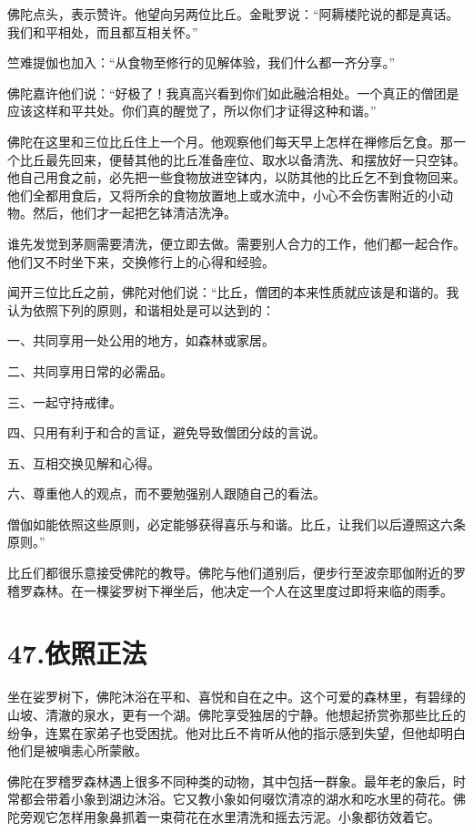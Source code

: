 \documentclass[12pt,twoside,openany]{book}
\begin{document}
佛陀点头，表示赞许。他望向另两位比丘。金毗罗说：“阿耨楼陀说的都是真话。我们和平相处，而且都互相关怀。”

竺难提伽也加入：“从食物至修行的见解体验，我们什么都一齐分享。”

佛陀嘉许他们说：“好极了！我真高兴看到你们如此融洽相处。一个真正的僧团是应该这样和平共处。你们真的醒觉了，所以你们才证得这种和谐。”

佛陀在这里和三位比丘住上一个月。他观察他们每天早上怎样在禅修后乞食。那一个比丘最先回来，便替其他的比丘准备座位、取水以备清洗、和摆放好一只空钵。他自己用食之前，必先把一些食物放进空钵内，以防其他的比丘乞不到食物回来。他们全都用食后，又将所余的食物放置地上或水流中，小心不会伤害附近的小动物。然后，他们才一起把乞钵清洁洗净。

谁先发觉到茅厕需要清洗，便立即去做。需要别人合力的工作，他们都一起合作。他们又不时坐下来，交换修行上的心得和经验。

闻开三位比丘之前，佛陀对他们说：“比丘，僧团的本来性质就应该是和谐的。我认为依照下列的原则，和谐相处是可以达到的：

一、共同享用一处公用的地方，如森林或家居。

二、共同享用日常的必需品。

三、一起守持戒律。

四、只用有利于和合的言证，避免导致僧团分歧的言说。

五、互相交换见解和心得。

六、尊重他人的观点，而不要勉强别人跟随自己的看法。

僧伽如能依照这些原则，必定能够获得喜乐与和谐。比丘，让我们以后遵照这六条原则。”

比丘们都很乐意接受佛陀的教导。佛陀与他们道别后，便步行至波奈耶伽附近的罗稽罗森林。在一棵娑罗树下禅坐后，他决定一个人在这里度过即将来临的雨季。


\chapter{47.依照正法}\label{ch47}

坐在娑罗树下，佛陀沐浴在平和、喜悦和自在之中。这个可爱的森林里，有碧绿的山坡、清澈的泉水，更有一个湖。佛陀享受独居的宁静。他想起挢赏弥那些比丘的纷争，连累在家弟子也受困扰。他对比丘不肯听从他的指示感到失望，但他却明白他们是被嗔恚心所蒙敝。

佛陀在罗稽罗森林遇上很多不同种类的动物，其中包括一群象。最年老的象后，时常都会带着小象到湖边沐浴。它又教小象如何啜饮清凉的湖水和吃水里的荷花。佛陀旁观它怎样用象鼻抓着一束荷花在水里清洗和摇去污泥。小象都彷效着它。
\end{document}

